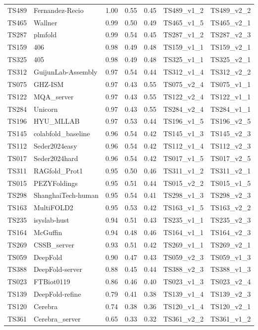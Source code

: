 \begin{table}[ht]
{\begin{tabular}{llrrrll}
TS489 & Fernandez-Recio & 1.00 & 0.55 & 0.45 & TS489\_v1\_2 & TS489\_v2\_2 \\ 
TS465 & Wallner & 0.99 & 0.50 & 0.49 & TS465\_v1\_5 & TS465\_v2\_1 \\ 
TS287 & plmfold & 0.99 & 0.54 & 0.45 & TS287\_v1\_2 & TS287\_v2\_3 \\ 
TS159 & 406 & 0.98 & 0.49 & 0.48 & TS159\_v1\_1 & TS159\_v2\_1 \\ 
TS325 & 405 & 0.98 & 0.49 & 0.48 & TS325\_v1\_1 & TS325\_v2\_1 \\ 
TS312 & GuijunLab-Assembly & 0.97 & 0.54 & 0.44 & TS312\_v1\_4 & TS312\_v2\_2 \\ 
TS075 & GHZ-ISM & 0.97 & 0.43 & 0.55 & TS075\_v2\_4 & TS075\_v1\_1 \\ 
TS122 & MQA\_server & 0.97 & 0.43 & 0.55 & TS122\_v2\_4 & TS122\_v1\_1 \\ 
TS284 & Unicorn & 0.97 & 0.43 & 0.55 & TS284\_v2\_4 & TS284\_v1\_1 \\ 
TS196 & HYU\_MLLAB & 0.97 & 0.53 & 0.44 & TS196\_v1\_5 & TS196\_v2\_5 \\ 
TS145 & colabfold\_baseline & 0.96 & 0.54 & 0.42 & TS145\_v1\_3 & TS145\_v2\_3 \\ 
TS112 & Seder2024easy & 0.96 & 0.54 & 0.42 & TS112\_v1\_4 & TS112\_v2\_3 \\ 
TS017 & Seder2024hard & 0.96 & 0.54 & 0.42 & TS017\_v1\_5 & TS017\_v2\_5 \\ 
TS311 & RAGfold\_Prot1 & 0.95 & 0.50 & 0.46 & TS311\_v1\_2 & TS311\_v2\_1 \\ 
TS015 & PEZYFoldings & 0.95 & 0.51 & 0.44 & TS015\_v2\_2 & TS015\_v1\_5 \\ 
TS298 & ShanghaiTech-human & 0.95 & 0.54 & 0.41 & TS298\_v1\_3 & TS298\_v2\_3 \\ 
TS163 & MultiFOLD2 & 0.95 & 0.53 & 0.42 & TS163\_v1\_5 & TS163\_v2\_2 \\ 
TS235 & isyslab-hust & 0.94 & 0.51 & 0.43 & TS235\_v1\_1 & TS235\_v2\_3 \\ 
TS164 & McGuffin & 0.94 & 0.48 & 0.46 & TS164\_v1\_1 & TS164\_v2\_3 \\ 
TS269 & CSSB\_server & 0.93 & 0.51 & 0.42 & TS269\_v1\_1 & TS269\_v2\_1 \\ 
TS059 & DeepFold & 0.90 & 0.47 & 0.43 & TS059\_v2\_3 & TS059\_v1\_3 \\ 
TS388 & DeepFold-server & 0.88 & 0.45 & 0.44 & TS388\_v2\_3 & TS388\_v1\_3 \\ 
TS023 & FTBiot0119 & 0.86 & 0.46 & 0.40 & TS023\_v1\_3 & TS023\_v2\_4 \\ 
TS139 & DeepFold-refine & 0.79 & 0.41 & 0.38 & TS139\_v1\_4 & TS139\_v2\_3 \\ 
TS120 & Cerebra & 0.74 & 0.38 & 0.36 & TS120\_v1\_4 & TS120\_v2\_1 \\ 
TS361 & Cerebra\_server & 0.65 & 0.33 & 0.32 & TS361\_v2\_2 & TS361\_v1\_2 \\ 
\bottomrule
\end{tabular}%
}
\end{table}

